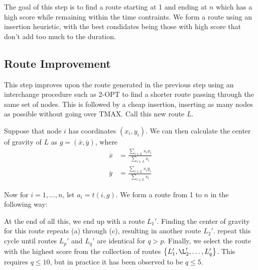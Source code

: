 \documentclass{exam}
\begin{document}
The goal of this step is to find a route starting at 1 and ending at $n$ which has a high score while remaining within the time contraints.
We form a route using an insertion heuristic, with the best condidates being those with high score that don't add too much to the duration.

\subsection{Route Improvement}
This step improves upon the route generated in the previous step using an interchange procedure such as 2-OPT to find a shorter route passing through the same set of nodes.
This is followed by a cheap insertion, inserting as many nodes as possible without going over TMAX. Call this new route $L$.

Suppose that node $i$ has coordinates $(x_i, y_i)$. We can then calculate the center of gravity of $L$ as $g = (\overline{x}, \overline{y})$, where
\begin{align*}
    \overline{x} &= \frac{\sum_{i\in L} s_ix_i}{\sum_{i\in L} s_i} \\
    \overline{y} &= \frac{\sum_{i\in L} s_iy_i}{\sum_{i\in L} s_i}
\end{align*}

Now for $i = 1, \hdots, n$, let $a_i = t(i, g)$. We form a route from 1 to $n$ in the following way:

At the end of all this, we end up with a route $L_1'$. Finding the center of gravity for this route repeats (a) through (c), resulting in another route $L_2'$.
repeat this cycle until routes $L_p'$ and $L_q'$ are identical for $q > p$. Finally, we select the route with the highest score from the collection
of routes $\cbrac{L_1', \L_2', \hdots, L_q'}$. This requires $q \leq 10$, but in practice it has been observed to be $q \leq 5$.
\end{document}
